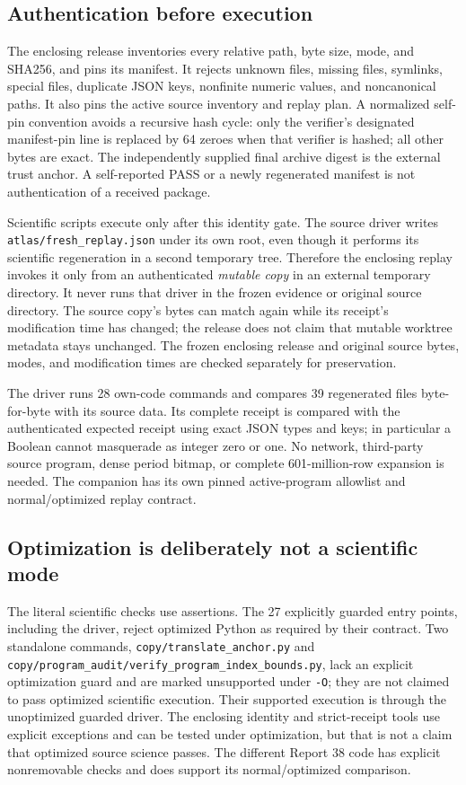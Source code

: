 \documentclass[11pt,letterpaper]{article}
\theoremstyle{definition}\newtheorem{definition}[theorem]{Definition}
\theoremstyle{remark}\newtheorem{remark}[theorem]{Remark}
\newcommand{\codeu}[1]{\nolinkurl{#1}}
\begin{document}
\subsection{Authentication before execution}
The enclosing release inventories every relative path, byte size, mode, and SHA256, and pins its manifest. It rejects unknown files, missing files, symlinks, special files, duplicate JSON keys, nonfinite numeric values, and noncanonical paths. It also pins the active source inventory and replay plan. A normalized self-pin convention avoids a recursive hash cycle: only the verifier's designated manifest-pin line is replaced by 64 zeroes when that verifier is hashed; all other bytes are exact. The independently supplied final archive digest is the external trust anchor. A self-reported PASS or a newly regenerated manifest is not authentication of a received package.

Scientific scripts execute only after this identity gate. The source driver writes \codeu{atlas/fresh_replay.json} under its own root, even though it performs its scientific regeneration in a second temporary tree. Therefore the enclosing replay invokes it only from an authenticated \emph{mutable copy} in an external temporary directory. It never runs that driver in the frozen evidence or original source directory. The source copy's bytes can match again while its receipt's modification time has changed; the release does not claim that mutable worktree metadata stays unchanged. The frozen enclosing release and original source bytes, modes, and modification times are checked separately for preservation.

The driver runs 28 own-code commands and compares 39 regenerated files byte-for-byte with its source data. Its complete receipt is compared with the authenticated expected receipt using exact JSON types and keys; in particular a Boolean cannot masquerade as integer zero or one. No network, third-party source program, dense period bitmap, or complete 601-million-row expansion is needed. The companion has its own pinned active-program allowlist and normal/optimized replay contract.

\subsection{Optimization is deliberately not a scientific mode}
The literal scientific checks use assertions. The 27 explicitly guarded entry points, including the driver, reject optimized Python as required by their contract. Two standalone commands, \codeu{copy/translate_anchor.py} and \codeu{copy/program_audit/verify_program_index_bounds.py}, lack an explicit optimization guard and are marked unsupported under \codeu{-O}; they are not claimed to pass optimized scientific execution. Their supported execution is through the unoptimized guarded driver. The enclosing identity and strict-receipt tools use explicit exceptions and can be tested under optimization, but that is not a claim that optimized source science passes. The different Report 38 code has explicit nonremovable checks and does support its normal/optimized comparison.
\end{document}
